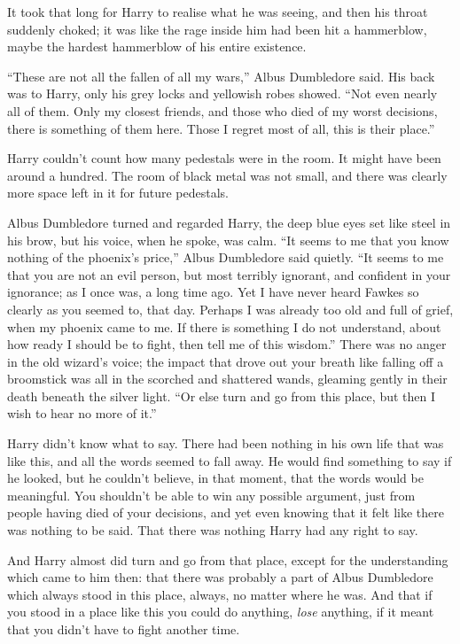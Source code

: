 It took that long for Harry to realise what he was seeing, and then his
throat suddenly choked; it was like the rage inside him had been hit a
hammerblow, maybe the hardest hammerblow of his entire existence.

``These are not all the fallen of all my wars,'' Albus Dumbledore said.
His back was to Harry, only his grey locks and yellowish robes showed.
``Not even nearly all of them. Only my closest friends, and those who
died of my worst decisions, there is something of them here. Those I
regret most of all, this is their place.''

Harry couldn't count how many pedestals were in the room. It might have
been around a hundred. The room of black metal was not small, and there
was clearly more space left in it for future pedestals.

Albus Dumbledore turned and regarded Harry, the deep blue eyes set like
steel in his brow, but his voice, when he spoke, was calm. ``It seems to
me that you know nothing of the phoenix's price,'' Albus Dumbledore said
quietly. ``It seems to me that you are not an evil person, but most
terribly ignorant, and confident in your ignorance; as I once was, a
long time ago. Yet I have never heard Fawkes so clearly as you seemed
to, that day. Perhaps I was already too old and full of grief, when my
phoenix came to me. If there is something I do not understand, about how
ready I should be to fight, then tell me of this wisdom.'' There was no
anger in the old wizard's voice; the impact that drove out your breath
like falling off a broomstick was all in the scorched and shattered
wands, gleaming gently in their death beneath the silver light. ``Or
else turn and go from this place, but then I wish to hear no more of
it.''

Harry didn't know what to say. There had been nothing in his own life
that was like this, and all the words seemed to fall away. He would find
something to say if he looked, but he couldn't believe, in that moment,
that the words would be meaningful. You shouldn't be able to win any
possible argument, just from people having died of your decisions, and
yet even knowing that it felt like there was nothing to be said. That
there was nothing Harry had any right to say.

And Harry almost did turn and go from that place, except for the
understanding which came to him then: that there was probably a part of
Albus Dumbledore which always stood in this place, always, no matter
where he was. And that if you stood in a place like this you could do
anything, \emph{lose} anything, if it meant that you didn't have to
fight another time.

